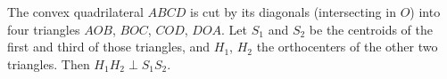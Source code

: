 The convex quadrilateral $ABCD$ is cut by its diagonals (intersecting in $O$) into four triangles $AOB$, $BOC$, $COD$, $DOA$. Let $S_1$ and $S_2$ be the centroids of the first and third of those triangles, and $H_1$, $H_2$ the orthocenters of the other two triangles. Then $H_1H_2 \perp S_1S_2$.
